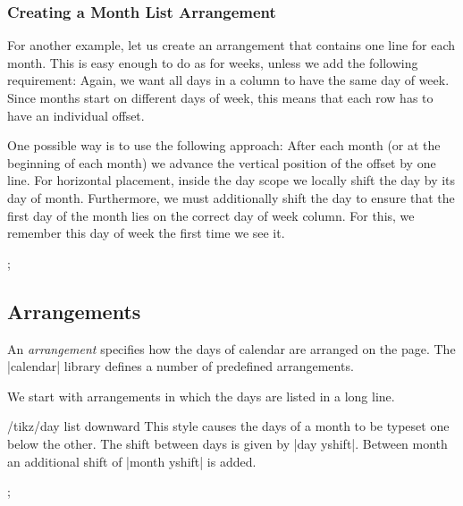 \subsubsection{Creating a Month List Arrangement}

For another example, let us create an arrangement that contains one line for
each month. This is easy enough to do as for weeks, unless we add the following
requirement: Again, we want all days in a column to have the same day of week.
Since months start on different days of week, this means that each row has to
have an individual offset.

One possible way is to use the following approach: After each month (or at the
beginning of each month) we advance the vertical position of the offset by one
line. For horizontal placement, inside the day scope we locally shift the day
by its day of month. Furthermore, we must additionally shift the day to ensure
that the first day of the month lies on the correct day of week column. For
this, we remember this day of week the first time we see it.
%
\begin{codeexample}[preamble={\usetikzlibrary{calendar}}]
\newcount\mycount
\tikz
  \calendar
    [dates=2000-01-01 to 2000-02-last,
     execute before day scope=
     {
       \ifdate{day of month=1} {
         \mycount=\pgfcalendarcurrentweekday
         \pgftransformyshift{-1em}
       }{}
     },
     execute at begin day scope=
     {
       \pgftransformxshift{\pgfcalendarcurrentday em}
       \pgftransformxshift{\the\mycount em}
     }];
\end{codeexample}


\subsection{Arrangements}

An \emph{arrangement} specifies how the days of calendar are arranged on the
page. The |calendar| library defines a number of predefined arrangements.

We start with arrangements in which the days are listed in a long line.

\begin{stylekey}{/tikz/day list downward}
    This style causes the days of a month to be typeset one below the other.
    The shift between days is given by |day yshift|. Between month an
    additional shift of |month yshift| is added.
\begin{codeexample}[preamble={\usetikzlibrary{calendar}}]
\tikz
  \calendar [dates=2000-01-28 to 2000-02-03,
             day list downward,month yshift=1em];
\end{codeexample}
\end{stylekey}

